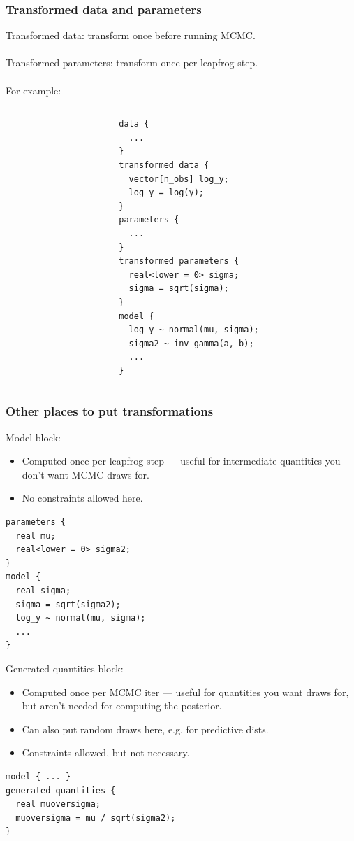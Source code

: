 \documentclass[xcolor=dvipsnames]{beamer}
\begin{document}
\begin{frame}[fragile]
\frametitle{Transformed data and parameters}
Transformed data: transform once before running MCMC.\\~\\

Transformed parameters: transform once per leapfrog step.\\~\\

For example:
\begin{columns}
\begin{column}{0.3\textwidth}
\end{column}
\begin{column}{0.7\textwidth}
{\tiny
\begin{verbatim}
data {
  ...
}
transformed data {
  vector[n_obs] log_y;
  log_y = log(y);
}
parameters {
  ...
}
transformed parameters {
  real<lower = 0> sigma;
  sigma = sqrt(sigma);
}
model {
  log_y ~ normal(mu, sigma);
  sigma2 ~ inv_gamma(a, b);
  ...
}
\end{verbatim}
}
\end{column}
\end{columns}
\end{frame}

\begin{frame}[fragile]
\frametitle{Other places to put transformations}
Model block:
\begin{itemize}
\item Computed once per leapfrog step --- useful for intermediate quantities you don't want MCMC draws for.
\item No constraints allowed here.
\end{itemize}
{\tiny
\begin{verbatim}
parameters {
  real mu;
  real<lower = 0> sigma2;
}
model {
  real sigma;
  sigma = sqrt(sigma2);
  log_y ~ normal(mu, sigma);
  ...
}
\end{verbatim}
}
Generated quantities block:
\begin{itemize}
\item Computed once per MCMC iter --- useful for quantities you want draws for, but aren't needed for computing the posterior.
\item Can also put random draws here, e.g. for predictive dists.
\item Constraints allowed, but not necessary.
\end{itemize}
{\tiny
\begin{verbatim}
model { ... }
generated quantities {
  real muoversigma;
  muoversigma = mu / sqrt(sigma2);
}
\end{verbatim}
}
\end{frame}
\end{document}
